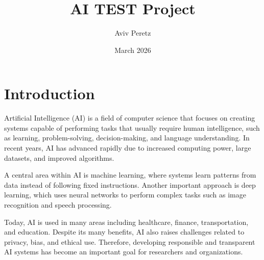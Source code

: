 \documentclass{article}
\title{AI TEST Project}
\author{Aviv Peretz}
\date{March 2026}
\begin{document}
\maketitle

\section{Introduction}
Artificial Intelligence (AI) is a field of computer science that focuses on creating systems capable of performing tasks that usually require human intelligence, such as learning, problem-solving, decision-making, and language understanding. In recent years, AI has advanced rapidly due to increased computing power, large datasets, and improved algorithms.

A central area within AI is machine learning, where systems learn patterns from data instead of following fixed instructions. Another important approach is deep learning, which uses neural networks to perform complex tasks such as image recognition and speech processing.

Today, AI is used in many areas including healthcare, finance, transportation, and education. Despite its many benefits, AI also raises challenges related to privacy, bias, and ethical use. Therefore, developing responsible and transparent AI systems has become an important goal for researchers and organizations.
\end{document}
